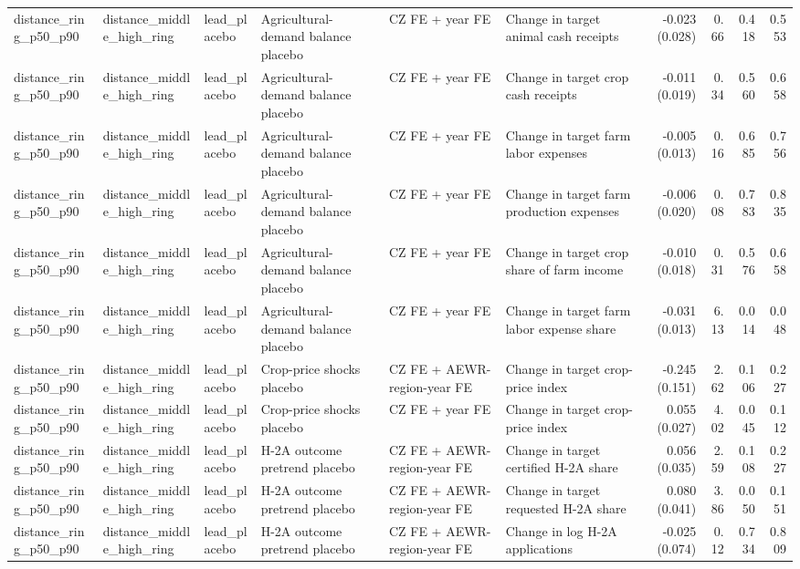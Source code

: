 \begin{tabular}{llllllrrrr}
distance_ring_p50_p90 & distance_middle_high_ring & lead_placebo & Agricultural-demand balance placebo & CZ FE + year FE & Change in target animal cash receipts & -0.023 (0.028) & 0.66 & 0.418 & 0.553 \\
distance_ring_p50_p90 & distance_middle_high_ring & lead_placebo & Agricultural-demand balance placebo & CZ FE + year FE & Change in target crop cash receipts & -0.011 (0.019) & 0.34 & 0.560 & 0.658 \\
distance_ring_p50_p90 & distance_middle_high_ring & lead_placebo & Agricultural-demand balance placebo & CZ FE + year FE & Change in target farm labor expenses & -0.005 (0.013) & 0.16 & 0.685 & 0.756 \\
distance_ring_p50_p90 & distance_middle_high_ring & lead_placebo & Agricultural-demand balance placebo & CZ FE + year FE & Change in target farm production expenses & -0.006 (0.020) & 0.08 & 0.783 & 0.835 \\
distance_ring_p50_p90 & distance_middle_high_ring & lead_placebo & Agricultural-demand balance placebo & CZ FE + year FE & Change in target crop share of farm income & -0.010 (0.018) & 0.31 & 0.576 & 0.658 \\
distance_ring_p50_p90 & distance_middle_high_ring & lead_placebo & Agricultural-demand balance placebo & CZ FE + year FE & Change in target farm labor expense share & -0.031 (0.013) & 6.13 & 0.014 & 0.048 \\
distance_ring_p50_p90 & distance_middle_high_ring & lead_placebo & Crop-price shocks placebo & CZ FE + AEWR-region-year FE & Change in target crop-price index & -0.245 (0.151) & 2.62 & 0.106 & 0.227 \\
distance_ring_p50_p90 & distance_middle_high_ring & lead_placebo & Crop-price shocks placebo & CZ FE + year FE & Change in target crop-price index & 0.055 (0.027) & 4.02 & 0.045 & 0.112 \\
distance_ring_p50_p90 & distance_middle_high_ring & lead_placebo & H-2A outcome pretrend placebo & CZ FE + AEWR-region-year FE & Change in target certified H-2A share & 0.056 (0.035) & 2.59 & 0.108 & 0.227 \\
distance_ring_p50_p90 & distance_middle_high_ring & lead_placebo & H-2A outcome pretrend placebo & CZ FE + AEWR-region-year FE & Change in target requested H-2A share & 0.080 (0.041) & 3.86 & 0.050 & 0.151 \\
distance_ring_p50_p90 & distance_middle_high_ring & lead_placebo & H-2A outcome pretrend placebo & CZ FE + AEWR-region-year FE & Change in log H-2A applications & -0.025 (0.074) & 0.12 & 0.734 & 0.809 \\

\end{tabular}
